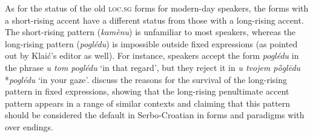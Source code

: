 \documentclass[output=paper,modfonts,nonflat
]{langsci/langscibook}
\begin{document}
As for the status of the old \textsc{loc}.\textsc{sg} forms for modern-day speakers, the forms with a short-rising accent have a different status from those with a long-rising accent. The short-rising pattern (\textit{kamènu}) is unfamiliar to most speakers, whereas the long-rising pattern (\textit{poglédu}) is impossible outside fixed expressions (as pointed out by Klaić's editor as well). For instance, speakers accept the form \textit{poglédu} in the phrase \textit{u tom poglédu} `in that regard', but they reject it in \textit{u tvojem pȍglēdu} *\textit{poglédu} `in your gaze'. \citet{SimonovicArsenijevic2015b} discuss the reasons for the survival of the long-rising pattern in fixed expressions, showing that the long-rising penultimate accent pattern appears in a range of similar contexts and claiming that this pattern should be considered the default in Serbo-Croatian in forms and paradigms with over endings. 
\end{document}
